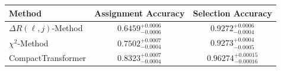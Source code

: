     \begin{tabular}{lcc}
        \toprule
        Method & Assignment Accuracy & Selection Accuracy \\
        \midrule
        $\Delta R(\ell,j)$-Method & $0.6459^{+0.0006}_{-0.0006}$ & $0.9272^{+0.0006}_{-0.0004}$ \\
        $\chi^2$-Method & $0.7502^{+0.0007}_{-0.0004}$ & $0.9273^{+0.0004}_{-0.0005}$ \\
        CompactTransformer & $0.8323^{+0.0007}_{-0.0004}$ & $0.96274^{+0.00015}_{-0.00016}$ \\
        \bottomrule
    \end{tabular}